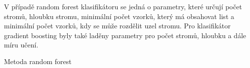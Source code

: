 V případě random forest klasifikátoru se jedná o parametry, které určují počet stromů, hloubku stromu, minimální počet vzorků, který má obsahovat list a minimální počet vzorků, kdy se může rozdělit uzel stromu. Pro klasifikátor gradient boosting byly také laděny parametry pro počet stromů, hloubku a dále míru učení.

Metoda random forest 





